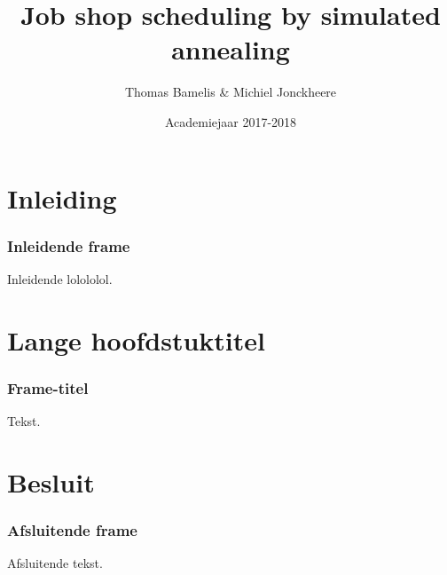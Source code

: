 \documentclass
   [kulak] %
   {kulakbeamer}
\title[Simulated annealing]{Job shop scheduling by simulated annealing}
\author[T. Bamelis \& M. Jonckheere]{Thomas Bamelis \& Michiel Jonckheere}
\institute[Kulak]{KU Leuven Kulak}
\date{Academiejaar 2017-2018}
\begin{document}
\begin{titleframe}
\titlepage
\end{titleframe}

\begin{outlineframe}[Overzicht]
\tableofcontents
\end{outlineframe}


\section{Inleiding}

\begin{frame}
\frametitle{Inleidende frame}
Inleidende lolololol.
\end{frame}

\section[Korte titel]{Lange hoofdstuktitel}

\begin{frame}
\frametitle{Frame-titel}
Tekst.
\end{frame}

\section{Besluit}
\begin{frame}
\frametitle{Afsluitende frame}
Afsluitende tekst.
\end{frame}
\end{document}

